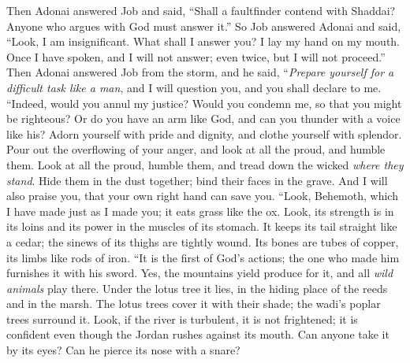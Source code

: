 \begin{biblechapter} %
\verse Then Adonai answered Job and said,
\verse “Shall a faultfinder contend with Shaddai? 
Anyone who argues with God must answer it.”
 So Job answered Adonai and said,
\verse “Look, I am insignificant. 
What shall I answer you? 
I lay my hand on my mouth.
\verse Once I have spoken, and I will not answer; 
even twice, but I will not proceed.”
 Then Adonai answered Job from the storm, and he said,
\verse “\textit{Prepare yourself for a difficult task like a man}, 
and I will question you, and you shall declare to me.
 “Indeed, would you annul my justice? 
Would you condemn me, so that you might be righteous?
\verse Or do you have an arm like God, 
and can you thunder with a voice like his?
\verse Adorn yourself with pride and dignity, 
and clothe yourself with splendor.
\verse Pour out the overflowing of your anger, 
and look at all the proud, and humble them.
\verse Look at all the proud, humble them, 
and tread down the wicked \textit{where they stand}.
\verse Hide them in the dust together; 
bind their faces in the grave.
\verse And I will also praise you, 
that your own right hand can save you.
\verse “Look, Behemoth, which I have made just as I made you; 
it eats grass like the ox.
\verse Look, its strength is in its loins 
and its power in the muscles of its stomach.
\verse It keeps its tail straight like a cedar; 
the sinews of its thighs are tightly wound.
\verse Its bones are tubes of copper, 
its limbs like rods of iron.
\verse “It is the first of God’s actions; 
the one who made him furnishes it with his sword.
\verse Yes, the mountains yield produce for it, 
and all \textit{wild animals} play there.
\verse Under the lotus tree it lies, 
in the hiding place of the reeds and in the marsh.
\verse The lotus trees cover it with their shade; 
the wadi’s poplar trees surround it.
\verse Look, if the river is turbulent, it is not frightened; 
it is confident even though the Jordan rushes against its mouth.
\verse Can anyone take it by its eyes? 
Can he pierce its nose with a snare?
\end{biblechapter}

